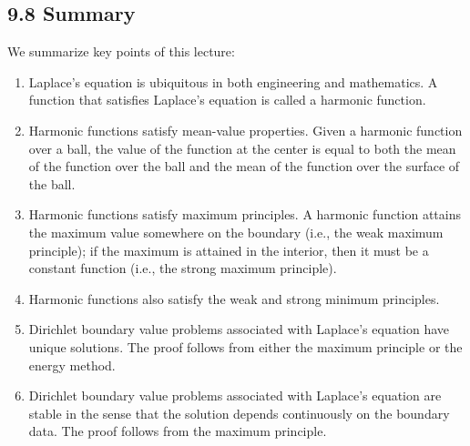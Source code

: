 \subsection{9.8 Summary}
We summarize key points of this lecture:
\begin{enumerate}
    \item Laplace's equation is ubiquitous in both engineering and mathematics. A function that satisfies Laplace's equation is called a harmonic function.
    \item Harmonic functions satisfy mean-value properties. Given a harmonic function over a ball, the value of the function at the center is equal to both the mean of the function over the ball and the mean of the function over the surface of the ball.
    \item Harmonic functions satisfy maximum principles. A harmonic function attains the maximum value somewhere on the boundary (i.e., the weak maximum principle); if the maximum is attained in the interior, then it must be a constant function (i.e., the strong maximum principle).
    \item Harmonic functions also satisfy the weak and strong minimum principles.
    \item Dirichlet boundary value problems associated with Laplace's equation have unique solutions. The proof follows from either the maximum principle or the energy method.
    \item Dirichlet boundary value problems associated with Laplace's equation are stable in the sense that the solution depends continuously on the boundary data. The proof follows from the maximum principle.
\end{enumerate}
